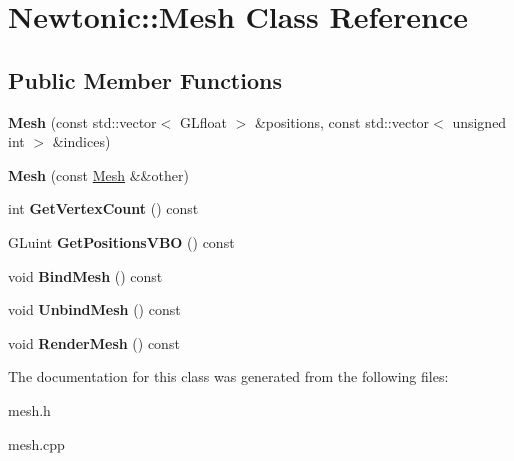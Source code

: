 \hypertarget{classNewtonic_1_1Mesh}{}\section{Newtonic\+::Mesh Class Reference}
\label{classNewtonic_1_1Mesh}
\subsection*{Public Member Functions}
\begin{DoxyCompactItemize}
\item 
\mbox{\label{classNewtonic_1_1Mesh_a837dd8906c42466437f97838ea20ee13}} 
{\bfseries Mesh} (const std\+::vector$<$ G\+Lfloat $>$ \&positions, const std\+::vector$<$ unsigned int $>$ \&indices)
\item 
\mbox{\label{classNewtonic_1_1Mesh_a046a250953cf0bdf3126966b2c2934ff}} 
{\bfseries Mesh} (const \mbox{\hyperlink{classNewtonic_1_1Mesh}{Mesh}} \&\&other)
\item 
\mbox{\label{classNewtonic_1_1Mesh_aeb925f8f35b5ae0f8806fec93a0ce3df}} 
int {\bfseries Get\+Vertex\+Count} () const
\item 
\mbox{\label{classNewtonic_1_1Mesh_a3963c201ee452015c04934159a075168}} 
G\+Luint {\bfseries Get\+Positions\+V\+BO} () const
\item 
\mbox{\label{classNewtonic_1_1Mesh_a1812474e01504b9711b1033e9cabb6d2}} 
void {\bfseries Bind\+Mesh} () const
\item 
\mbox{\label{classNewtonic_1_1Mesh_a969fd03243232ec7a0e7ad431b7a5a27}} 
void {\bfseries Unbind\+Mesh} () const
\item 
\mbox{\label{classNewtonic_1_1Mesh_a70203a4fbad3b3ed77e77b1612145c5a}} 
void {\bfseries Render\+Mesh} () const
\end{DoxyCompactItemize}


The documentation for this class was generated from the following files\+:\begin{DoxyCompactItemize}
\item 
mesh.\+h\item 
mesh.\+cpp\end{DoxyCompactItemize}
